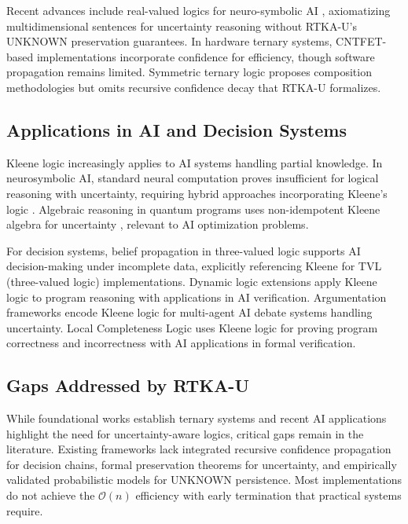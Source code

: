 \documentclass[11pt,a4paper]{article}
\begin{document}
Recent advances include real-valued logics for neuro-symbolic AI \cite{besold2022}, axiomatizing multidimensional sentences for uncertainty reasoning without RTKA-U's UNKNOWN preservation guarantees. In hardware ternary systems, CNTFET-based implementations \cite{reza2014} incorporate confidence for efficiency, though software propagation remains limited. Symmetric ternary logic \cite{symmetric2023} proposes composition methodologies but omits recursive confidence decay that RTKA-U formalizes.

\subsection{Applications in AI and Decision Systems}

Kleene logic increasingly applies to AI systems handling partial knowledge. In neurosymbolic AI, standard neural computation proves insufficient for logical reasoning with uncertainty, requiring hybrid approaches incorporating Kleene's logic \cite{neurosymbolic2025}. Algebraic reasoning in quantum programs uses non-idempotent Kleene algebra for uncertainty \cite{quantum2021}, relevant to AI optimization problems.

For decision systems, belief propagation in three-valued logic \cite{belief2022} supports AI decision-making under incomplete data, explicitly referencing Kleene for TVL (three-valued logic) implementations. Dynamic logic extensions \cite{dynamic2024} apply Kleene logic to program reasoning with applications in AI verification. Argumentation frameworks \cite{argumentation2025} encode Kleene logic for multi-agent AI debate systems handling uncertainty. Local Completeness Logic \cite{local2022} uses Kleene logic for proving program correctness and incorrectness with AI applications in formal verification.

\subsection{Gaps Addressed by RTKA-U}

While foundational works establish ternary systems and recent AI applications highlight the need for uncertainty-aware logics, critical gaps remain in the literature. Existing frameworks lack integrated recursive confidence propagation for decision chains, formal preservation theorems for uncertainty, and empirically validated probabilistic models for UNKNOWN persistence. Most implementations do not achieve the $\mathcal{O}(n)$ efficiency with early termination that practical systems require.
\end{document}
